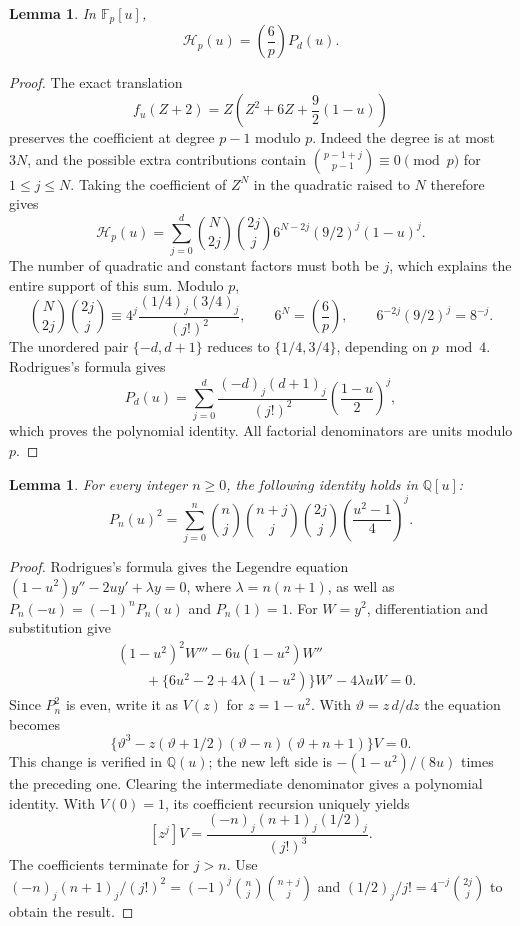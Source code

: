 \documentclass[11pt,a4paper]{article}
\newtheorem{lemma}[theorem]{Lemma}
\theoremstyle{remark}
\newcommand{\Q}{\mathbb Q}
\newcommand{\Fp}{\mathbb F_p}
\newcommand{\leg}[2]{\left(\frac{#1}{#2}\right)}
\begin{document}
\begin{lemma}\label{lem:hasse}
In $\Fp[u]$,
\begin{equation}\label{eq:hasse-legendre}
 \mathcal H_p(u)=\leg6p P_d(u).
\end{equation}
\end{lemma}
\begin{proof}
The exact translation
\[
 f_u(Z+2)=Z\left(Z^2+6Z+\frac92(1-u)\right)
\]
preserves the coefficient at degree $p-1$ modulo $p$.
Indeed the degree is at most $3N$, and the possible extra
contributions contain
$\binom{p-1+j}{p-1}\equiv0\pmod p$ for $1\le j\le N$.
Taking the coefficient of $Z^N$ in the quadratic raised to $N$
therefore gives
\[
 \mathcal H_p(u)=\sum_{j=0}^{d}\binom N{2j}\binom{2j}j
       6^{N-2j}(9/2)^j(1-u)^j.
\]
The number of quadratic and constant factors must both be $j$, which
explains the entire support of this sum. Modulo $p$,
\[
 \binom N{2j}\binom{2j}j
 \equiv4^j\frac{(1/4)_j(3/4)_j}{(j!)^2},\qquad
 6^N=\leg6p,\qquad 6^{-2j}(9/2)^j=8^{-j}.
\]
The unordered pair $\{-d,d+1\}$ reduces to $\{1/4,3/4\}$,
depending on $p\bmod4$. Rodrigues's formula gives
\[
 P_d(u)=\sum_{j=0}^d\frac{(-d)_j(d+1)_j}{(j!)^2}
                        \left(\frac{1-u}{2}\right)^j,
\]
which proves the polynomial identity. All factorial denominators are
units modulo $p$.
\end{proof}

\begin{lemma}\label{lem:legendre-square}
For every integer $n\ge0$, the following identity holds in $\Q[u]$:
\begin{equation}\label{eq:legendre-square}
 P_n(u)^2=\sum_{j=0}^n\binom nj\binom{n+j}j\binom{2j}j
                            \left(\frac{u^2-1}{4}\right)^j.
\end{equation}
\end{lemma}
\begin{proof}
Rodrigues's formula gives the Legendre equation
$(1-u^2)y''-2uy'+\lambda y=0$, where $\lambda=n(n+1)$,
as well as $P_n(-u)=(-1)^nP_n(u)$ and $P_n(1)=1$.
For $W=y^2$, differentiation and substitution give
\[
\begin{split}
 &(1-u^2)^2W'''-6u(1-u^2)W''\\
 &\qquad+\{6u^2-2+4\lambda(1-u^2)\}W'-4\lambda uW=0.
\end{split}
\]
Since $P_n^2$ is even, write it as $V(z)$ for $z=1-u^2$.
With $\vartheta=z\,d/dz$ the equation becomes
\[
 \{\vartheta^3-z(\vartheta+1/2)(\vartheta-n)
                                     (\vartheta+n+1)\}V=0.
\]
This change is verified in $\Q(u)$; the new left side is
$-(1-u^2)/(8u)$ times the preceding one. Clearing the intermediate
denominator gives a polynomial identity. With $V(0)=1$, its
coefficient recursion uniquely yields
\[
 [z^j]V=\frac{(-n)_j(n+1)_j(1/2)_j}{(j!)^3}.
\]
The coefficients terminate for $j>n$. Use
$(-n)_j(n+1)_j/(j!)^2=(-1)^j\binom nj\binom{n+j}j$ and
$(1/2)_j/j!=4^{-j}\binom{2j}j$ to obtain the result.
\end{proof}
\end{document}
